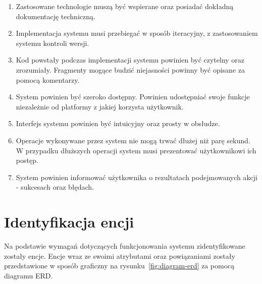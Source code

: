 \begin{enumerate}

\item Zastosowane technologie muszą być wspierane oraz posiadać dokładną dokumentację techniczną.

\item Implementacja systemu musi przebiegać w sposób iteracyjny, z zastosowaniem systemu kontroli wersji.

\item Kod powstały podczas implementacji systemu powinien być czytelny oraz zrozumiały. Fragmenty mogące budzić niejasności powinny być opisane za pomocą komentarzy.

\item System powinien być szeroko dostępny. Powinien udostępniać swoje funkcje niezależnie od platformy z jakiej korzysta użytkownik. 

\item Interfejs systemu powinien być intuicyjny oraz prosty w obsłudze.

\item Operacje wykonywane przez system nie mogą trwać dłużej niż parę sekund. W przypadku dłuższych operacji system musi prezentować użytkownikowi ich postęp.

\item System powinien informować użytkownika o rezultatach podejmowanych akcji - sukcesach oraz błędach.

\end{enumerate}


\section{Identyfikacja encji}

Na podstawie wymagań dotyczących funkcjonowania systemu zidentyfikowane zostały encje. Encje wraz ze swoimi atrybutami oraz powiązaniami zostały przedstawione w sposób graficzny na rysunku~\ref{fig:diagram-erd} za pomocą diagramu ERD.

